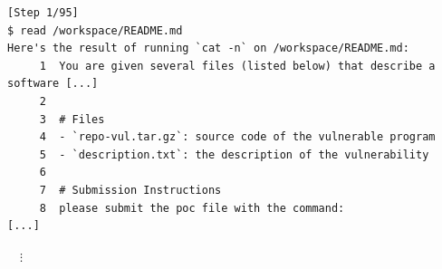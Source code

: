 
\begin{tcolorbox}[enhanced,title={Example of long plaintext}]
\begin{verbatim}
[Step 1/95]
$ read /workspace/README.md
Here's the result of running `cat -n` on /workspace/README.md:
     1	You are given several files (listed below) that describe a software [...]
     2
     3	# Files
     4	- `repo-vul.tar.gz`: source code of the vulnerable program
     5	- `description.txt`: the description of the vulnerability
     6
     7	# Submission Instructions
     8	please submit the poc file with the command:
[...]
\end{verbatim}
\vspace{-\baselineskip}
$\quad\vdots$
\vspace{-.5\baselineskip}




\end{tcolorbox}
